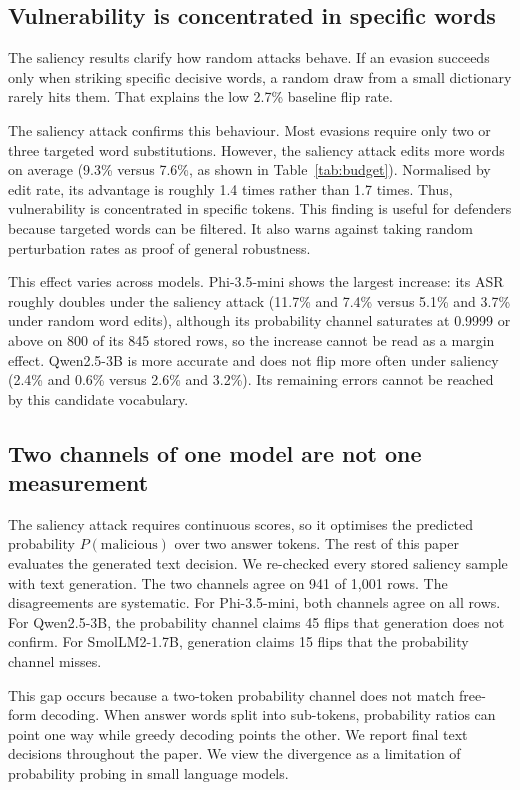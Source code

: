 \subsection{Vulnerability is concentrated in specific words}

The saliency results clarify how random attacks behave. If an evasion succeeds
only when striking specific decisive words, a random draw from a small
dictionary rarely hits them. That explains the low 2.7\% baseline flip rate.

The saliency attack confirms this behaviour. Most evasions require only two or
three targeted word substitutions. However, the saliency attack edits more words
on average (9.3\% versus 7.6\%, as shown in Table~\ref{tab:budget}). Normalised
by edit rate, its advantage is roughly 1.4 times rather than 1.7 times. Thus,
vulnerability is concentrated in specific tokens. This finding is useful for
defenders because targeted words can be filtered. It also warns against taking
random perturbation rates as proof of general robustness.

This effect varies across models. Phi-3.5-mini shows the largest increase: its
ASR roughly doubles under the saliency attack (11.7\% and 7.4\% versus 5.1\% and
3.7\% under random word edits), although its probability channel saturates at
0.9999 or above on 800 of its 845 stored rows, so the increase cannot be read as
a margin effect. Qwen2.5-3B is more accurate and does not flip more often under
saliency (2.4\% and 0.6\% versus 2.6\% and 3.2\%).
Its remaining errors cannot be reached by this candidate vocabulary.

\subsection{Two channels of one model are not one measurement}

The saliency attack requires continuous scores, so it optimises the predicted
probability $P(\text{malicious})$ over two answer tokens. The rest of this
paper evaluates the generated text decision. We re-checked every stored
saliency sample with text generation. The two channels agree on 941 of 1{,}001
rows. The disagreements are systematic. For Phi-3.5-mini, both channels agree on
all rows. For Qwen2.5-3B, the probability channel claims 45 flips that
generation does not confirm. For SmolLM2-1.7B, generation claims 15 flips that
the probability channel misses.

This gap occurs because a two-token probability channel does not match free-form
decoding. When answer words split into sub-tokens, probability ratios can point
one way while greedy decoding points the other. We report final text decisions
throughout the paper. We view the divergence as a limitation of probability
probing in small language models.


